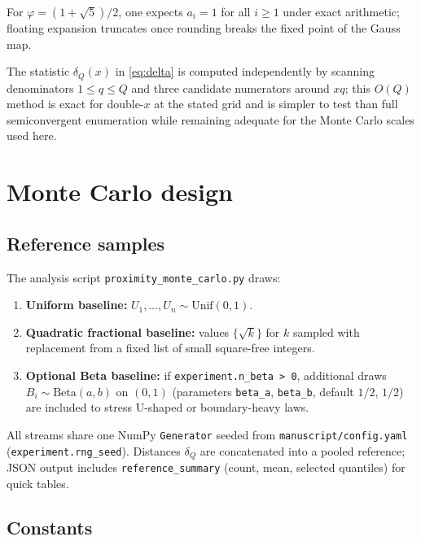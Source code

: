 \documentclass[
]{article}
\providecommand{\tightlist}{%
  \setlength{\itemsep}{0pt}\setlength{\parskip}{0pt}}
\begin{document}
For \(\varphi = (1+\sqrt{5})/2\), one expects \(a_i=1\) for all
\(i \geq 1\) under exact arithmetic; floating expansion truncates once
rounding breaks the fixed point of the Gauss map.

The statistic \(\delta_Q(x)\) in \eqref{eq:delta} is computed
independently by scanning denominators \(1 \leq q \leq Q\) and three
candidate numerators around \(xq\); this \(O(Q)\) method is exact for
double-\(x\) at the stated grid and is simpler to test than full
semiconvergent enumeration while remaining adequate for the Monte Carlo
scales used here.

\newpage

\section{Monte Carlo design}\label{monte-carlo-design}

\subsection{Reference samples}\label{reference-samples}

The analysis script \texttt{proximity\_monte\_carlo.py} draws:

\begin{enumerate}
\def\labelenumi{\arabic{enumi}.}
\tightlist
\item
  \textbf{Uniform baseline:} \(U_1,\ldots,U_n \sim \mathrm{Unif}(0,1)\).
\item
  \textbf{Quadratic fractional baseline:} values \(\{\sqrt{k}\}\) for
  \(k\) sampled with replacement from a fixed list of small square-free
  integers.
\item
  \textbf{Optional Beta baseline:} if
  \texttt{experiment.n\_beta\ \textgreater{}\ 0}, additional draws
  \(B_i \sim \mathrm{Beta}(a,b)\) on \((0,1)\) (parameters
  \texttt{beta\_a}, \texttt{beta\_b}, default \(1/2\), \(1/2\)) are
  included to stress U-shaped or boundary-heavy laws.
\end{enumerate}

All streams share one NumPy \texttt{Generator} seeded from
\texttt{manuscript/config.yaml} (\texttt{experiment.rng\_seed}).
Distances \(\delta_Q\) are concatenated into a pooled reference; JSON
output includes \texttt{reference\_summary} (count, mean, selected
quantiles) for quick tables.

\subsection{Constants}\label{constants}
\end{document}
